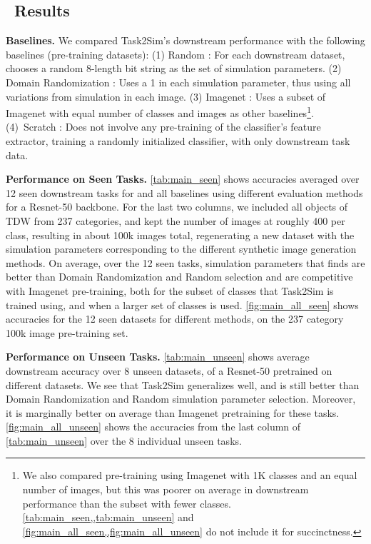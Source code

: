 \subsection{\name~Results}

\noindent \textbf{Baselines.} We compared Task2Sim's downstream performance with the following baselines (pre-training datasets):
(1) Random : For each downstream dataset, chooses a random 8-length bit string as the set of simulation parameters. 
(2) Domain Randomization : Uses a 1 in each simulation parameter, thus using all variations from simulation in each image. 
(3) Imagenet : Uses a subset of Imagenet with equal number of classes and images as other baselines\footnote{ We also compared pre-training using Imagenet with 1K classes and an equal number of images, but this was poorer on average in downstream performance than the subset with fewer classes. \cref{tab:main_seen,,tab:main_unseen} and \cref{fig:main_all_seen,,fig:main_all_unseen} do not include it for succinctness.}.
(4)~Scratch : Does not involve any pre-training of the classifier's feature extractor, training a randomly initialized classifier, with only downstream task data.









\vspace{1mm}
\noindent \textbf{Performance on Seen Tasks.} \cref{tab:main_seen} shows accuracies averaged over 12 seen downstream tasks for \ours and all baselines using different evaluation methods for a Resnet-50 backbone. For the last two columns, we included all objects of TDW from 237 categories, and kept the number of images at roughly 400 per class, resulting in about 100k images total, regenerating a new dataset with the simulation parameters corresponding to the different synthetic image generation methods. On average, over the 12 seen tasks, simulation parameters that \ours finds are better than Domain Randomization and Random selection and are competitive with Imagenet pre-training, both for the subset of classes that Task2Sim is trained using, and when a larger set of classes is used. \cref{fig:main_all_seen} shows accuracies for the 12 seen datasets for different methods, on the 237 category 100k image pre-training set.



\vspace{1mm}
\noindent \textbf{Performance on Unseen Tasks.} \cref{tab:main_unseen} shows average downstream accuracy over 8 unseen datasets, of a Resnet-50 pretrained on different datasets. 
We see that Task2Sim generalizes well, and is still better than Domain Randomization and Random simulation parameter selection. Moreover, it is marginally better on average than Imagenet pretraining for these tasks. \cref{fig:main_all_unseen} shows the accuracies from the last column of \cref{tab:main_unseen} over the 8 individual unseen tasks.




